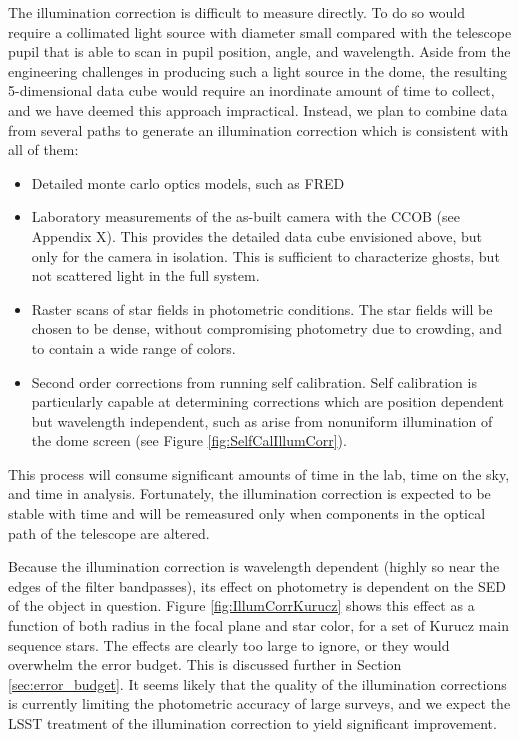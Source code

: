\documentclass[12pt,preprint]{aastex}
\begin{document}
The illumination correction is difficult to measure directly.  To
do so would require a collimated light source with diameter small compared 
with the telescope pupil that is able to scan in pupil position, angle,
and wavelength.  Aside from the engineering challenges in producing such
a light source in the dome, the resulting 5-dimensional data cube would require
an inordinate amount of time to collect, and we have deemed this approach 
impractical.  Instead, we plan to combine data from several paths to generate
an illumination correction which is consistent with all of them:

\begin{itemize}
\item Detailed monte carlo optics models, such as FRED
\item {Laboratory measurements of the as-built camera with the CCOB (see Appendix X).  This provides
the detailed data cube envisioned above, but only for the camera in isolation.  This is sufficient to
characterize ghosts, but not scattered light in the full system.}
\item {Raster scans of star fields in photometric conditions.  The star fields will be chosen
to be dense, without compromising photometry due to crowding, and to contain a wide range of colors.}
\item {Second order corrections from running self calibration.  Self calibration is particularly capable
at determining corrections which are position dependent but wavelength independent, such as 
arise from nonuniform illumination of the dome screen (see Figure \ref{fig:SelfCalIllumCorr}).}
\end{itemize}

This process will consume significant amounts of time in the lab, time on the sky, and time in analysis.  
Fortunately, the illumination correction is expected to be stable with time and will be remeasured only when components in the
optical path of the telescope are altered.

Because the illumination correction is wavelength dependent (highly so near the edges of the filter bandpasses), its effect on photometry is dependent on the SED of the object in question.  Figure \ref{fig:IllumCorrKurucz} shows this effect as a function of both 
radius in the focal plane and star color, for a set of Kurucz main sequence stars.   The effects are clearly too large to ignore, or they would overwhelm the error budget.   This is discussed further in Section \ref{sec:error_budget}.  It seems likely that the quality 
of the illumination corrections is currently limiting the photometric accuracy of large surveys, and we expect the LSST treatment of the illumination correction to yield significant improvement.
\end{document}
